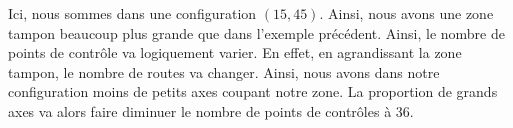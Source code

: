 Ici, nous sommes dans une configuration $(15,45)$. Ainsi, nous avons une zone tampon beaucoup plus grande que dans l'exemple précédent. Ainsi, le nombre de points de contrôle va logiquement varier. En effet, en agrandissant la zone tampon, le nombre de routes va changer. Ainsi, nous avons dans notre configuration moins de petits axes coupant notre zone. La proportion de grands axes va alors faire diminuer le nombre de points de contrôles à 36.